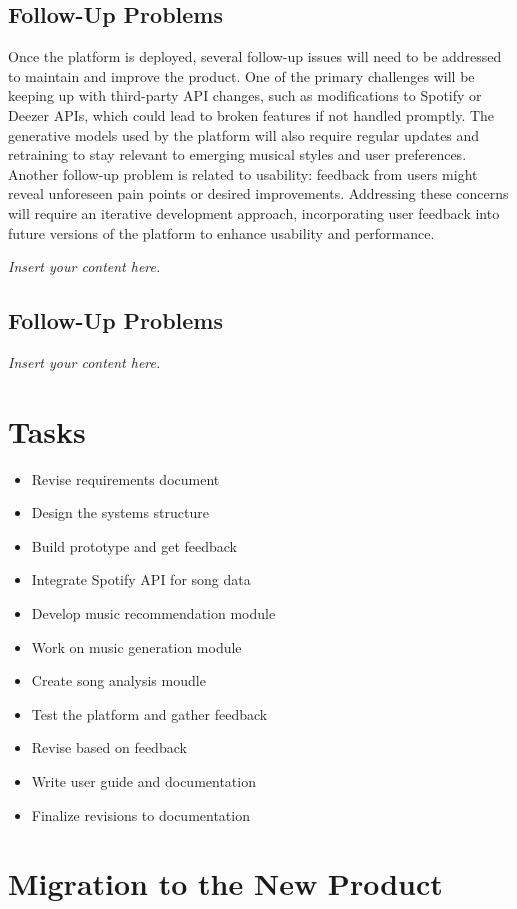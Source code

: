 \documentclass[12pt]{article}
\newcommand{\lips}{\textit{Insert your content here.}}
\begin{document}
\subsection{Follow-Up Problems}

Once the platform is deployed, several follow-up issues will need to be addressed to maintain and improve the product. One of the primary challenges will be keeping up with third-party API changes, such as modifications to Spotify or Deezer APIs, which could lead to broken features if not handled promptly. The generative models used by the platform will also require regular updates and retraining to stay relevant to emerging musical styles and user preferences. Another follow-up problem is related to usability: feedback from users might reveal unforeseen pain points or desired improvements. Addressing these concerns will require an iterative development approach, incorporating user feedback into future versions of the platform to enhance usability and performance.


\lips
\subsection{Follow-Up Problems}
\lips

\section{Tasks}
\begin{itemize}
  \item Revise requirements document
  \item Design the systems structure
  \item Build prototype and get feedback
  \item Integrate Spotify API for song data
  \item Develop music recommendation module
  \item Work on music generation  module
  \item Create song analysis moudle
  \item Test the platform and gather feedback
  \item Revise based on feedback
  \item Write user guide and documentation
  \item Finalize revisions to documentation
\end{itemize}

\section{Migration to the New Product}
\end{document}
